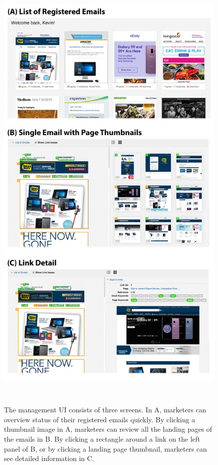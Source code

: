 \documentclass{sigchi}
\begin{document}
\begin{figure}[tbp]
\centering
  \includegraphics[width=\columnwidth]{figures/system-screenshots}
  \caption{The management UI consists of three screens. In A, marketers can overview status of their registered emails quickly. By clicking a thumbnail image in A, marketers can review all the landing pages of the emails in B. By clicking a rectangle around a link on the left panel of B, or by clicking a landing page thumbnail, marketers can see detailed information in C.}~\label{fig:system-screenshots}
\end{figure}
\end{document}
